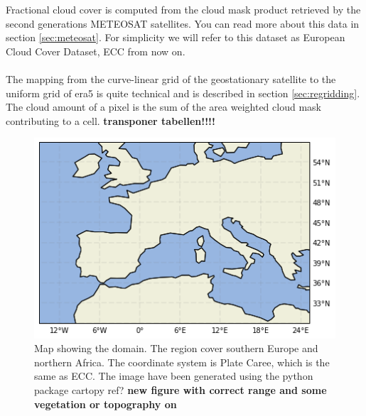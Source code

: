 Fractional cloud cover is computed from the cloud mask product retrieved by the second generations METEOSAT satellites. You can read more about this data in section \ref{sec:meteosat}. For simplicity we will refer to this dataset as European Cloud Cover Dataset, ECC from now on. 
\\ \\ 
The mapping from the curve-linear grid of the geostationary satellite to the uniform grid of era5 is quite technical and is described in section \ref{sec:regridding}. The cloud amount of a pixel is the sum of the area weighted cloud mask contributing to a cell.
\textbf{transponer tabellen!!!!}


\begin{figure}[h]
    \centering
    \includegraphics[scale = 0.7]{Chapter2_Theory/images/Domain.png}
    \caption{Map showing the domain. The region cover southern Europe and northern Africa. The coordinate system is Plate Caree, which is the same as ECC. The image have been generated using the python package cartopy ref? \textbf{new figure with correct range and some vegetation or topography on  }}
    \label{fig:map}
\end{figure}

